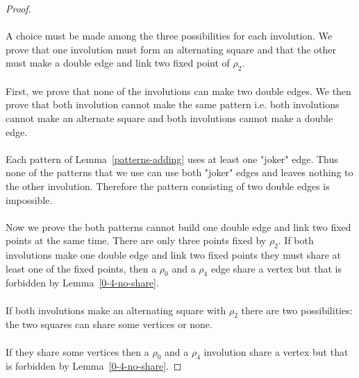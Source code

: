 \begin{proof}
\paragraph{}
A choice must be made among the three possibilities for each involution. We prove that one involution must form an alternating square and that the other must make a double edge and link two fixed point of $\rho_2$.

\paragraph{}
First, we prove that none of the involutions can make two double edges. We then prove that both involution cannot make the same pattern i.e. both involutions cannot make an alternate square and both involutions cannot make a double edge.

\paragraph{}
Each pattern of Lemma~\ref{patterns-adding} uses at least one "joker" edge. Thus none of the patterns that we use can use both "joker" edges and leaves nothing to the other involution. Therefore the pattern consisting of two double edges is impossible.

\paragraph{}
Now we prove the both patterns cannot build one double edge and link two fixed points at the same time. There are only three points fixed by $\rho_2$. If both involutions make one double edge and link two fixed points they must share at least one of the fixed points, then a $\rho_0$ and a $\rho_4$ edge share a vertex but that is forbidden by Lemma~\ref{0-4-no-share}.

\paragraph{}
If both involutions make an alternating square with $\rho_2$ there are two possibilities: the two squares can share some vertices or none.


\paragraph{}
If they share some vertices then a $\rho_0$ and a $\rho_4$ involution share a vertex but that is forbidden by Lemma~\ref{0-4-no-share}.


\end{proof}
